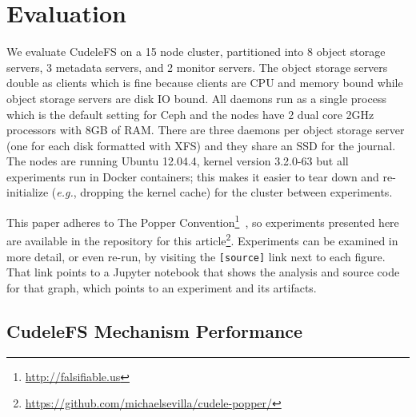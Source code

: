 \section{Evaluation}
\label{sec:evaluation}

We evaluate CudeleFS on a 15 node cluster, partitioned into 8 object storage
servers, 3 metadata servers, and 2 monitor servers. The object storage servers
double as clients which is fine because clients are CPU and memory bound while
object storage servers are disk IO bound. All daemons run as a single process
which is the default setting for Ceph and the nodes have 2 dual core 2GHz
processors with 8GB of RAM. There are three daemons per object storage server
(one for each disk formatted with XFS) and they share an SSD for the journal.
The nodes are running Ubuntu 12.04.4, kernel version 3.2.0-63 but all
experiments run in Docker containers; this makes it easier to tear down and
re-initialize ({\it e.g.}, dropping the kernel cache) for the cluster between
experiments.

This paper adheres to The Popper
Convention\footnote{\url{http://falsifiable.us}}~\cite{jimenez_popper_2016}, so
experiments presented here are available in the repository for this
article\footnote{\url{https://github.com/michaelsevilla/cudele-popper/}}.
Experiments can be examined in more detail, or even re-run, by visiting the
\texttt{[source]} link next to each figure. That link points to a Jupyter
notebook that shows the analysis and source code for that graph, which points
to an experiment and its artifacts.


\subsection{CudeleFS Mechanism Performance}

